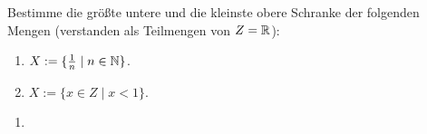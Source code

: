 \begin{aufg}[6 Punkte]
Bestimme die gr\"o{\ss}te untere und die kleinste obere Schranke der folgenden Mengen (verstanden als Teilmengen von $Z=\mathbb{R}$):
\begin{enumerate}[label=$\mathrm{(\roman*)}$, ref=$\mathrm{\roman*}$]
\item $X:=\{ \frac{1}{n} \mid n\in \mathbb{N}\}$.
\item $X:=\{ x \in Z \mid x < 1 \}$.
\end{enumerate}
\end{aufg}
 
\bigskip

\begin{lsg}
\begin{enumerate}[label=$\mathrm{(\roman*)}$, ref=$\mathrm{\roman*}$]
\item 
\end{enumerate}
\end{lsg}



